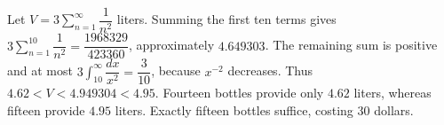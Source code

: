 Let $V=3\sum_{n=1}^{\infty}\dfrac{1}{n^2}$ liters. Summing the first ten terms gives $3\sum_{n=1}^{10}\dfrac{1}{n^2}=\dfrac{1968329}{423360}$, approximately $4.649303$. The remaining sum is positive and at most $3\int_{10}^{\infty}\dfrac{dx}{x^2}=\dfrac{3}{10}$, because $x^{-2}$ decreases. Thus $4.62<V<4.949304<4.95$. Fourteen bottles provide only $4.62$ liters, whereas fifteen provide $4.95$ liters. Exactly fifteen bottles suffice, costing $\boxed{30}$ dollars.
